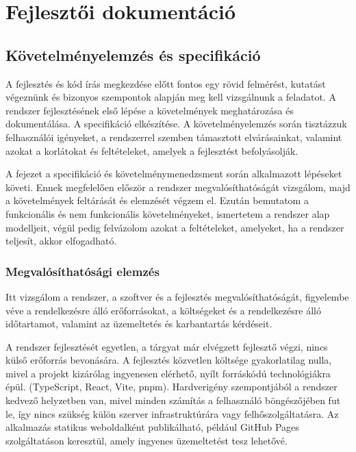 \chapter{Fejlesztői dokumentáció}
\label{ch:impl}

\section{Követelményelemzés és specifikáció}
\label{sec:req}

A fejlesztés és kód írás megkezdése előtt fontos egy rövid felmérést, kutatást
végeznünk és bizonyos szempontok alapján meg kell vizsgálnunk a feladatot.
A rendszer fejlesztésének első lépése a követelmények meghatározása és dokumentálása.
A specifikáció elkészítése.
 A követelményelemzés során tisztázzuk felhasználói igényeket, a rendszerrel szemben támasztott elvárásainkat,
valamint azokat a korlátokat és feltételeket, amelyek a fejlesztést befolyásolják.
 
   
A fejezet a specifikáció és követelménymenedzsment során alkalmazott
lépéseket követi. Ennek megfelelően először a rendszer megvalósíthatóságát
  vizsgálom, majd a követelmények feltárását és elemzését végzem el. 
Ezután bemutatom a funkcionális és nem funkcionális követelményeket, 
ismertetem a rendszer alap modelljeit, végül pedig felvázolom azokat a feltételeket, amelyeket,
ha a rendszer teljesít, akkor elfogadható.

\clearpage
\subsection{Megvalósíthatósági elemzés}

Itt vizsgálom a rendszer, a szoftver és a fejlesztés megvalósíthatóságát,
 figyelembe véve a rendelkezésre álló erőforrásokat, a költségeket és a rendelkezésre álló időtartamot,
  valamint az üzemeltetés és karbantartás kérdéseit.

A rendszer fejlesztését egyetlen, a tárgyat már elvégzett fejlesztő végzi, nincs külső erőforrás bevonására.
 A fejlesztés közvetlen költsége gyakorlatilag nulla, mivel a projekt kizárólag ingyenesen elérhető,
nyílt forráskódú technológiákra épül. (TypeScript, React, Vite, pnpm).
Hardverigény szempontjából a rendszer kedvező helyzetben van, mivel minden számítás a felhasználó
böngészőjében fut le, így nincs szükség külön szerver infrastruktúrára vagy felhőszolgáltatásra.
Az alkalmazás statikus weboldalként publikálható, például GitHub Pages szolgáltatáson keresztül,
amely ingyenes üzemeltetést tesz lehetővé.

